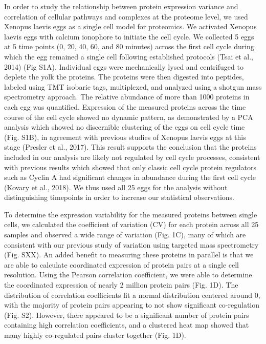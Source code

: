 In order to study the relationship between protein expression variance and correlation of cellular pathways and complexes at the proteome level, we used Xenopus laevis eggs as a single cell model for proteomics. We activated Xenopus laevis eggs with calcium ionophore to initiate the cell cycle. We collected 5 eggs at 5 time points (0, 20, 40, 60, and 80 minutes) across the first cell cycle during which the egg remained a single cell following established protocols (Tsai et al., 2014)  (Fig S1A). Individual eggs were mechanically lysed and centrifuged to deplete the yolk the proteins. The proteins were then digested into peptides, labeled using TMT isobaric tags, multiplexed, and analyzed using a shotgun mass spectrometry approach. The relative abundance of more than 1000 proteins in each egg was quantified. Expression of the measured proteins across the time course of the cell cycle showed no dynamic pattern, as demonstrated by a PCA analysis which showed no discernible clustering of the eggs on cell cycle time (Fig. S1B), in agreement with previous studies of Xenopus laevis eggs at this stage (Presler et al., 2017). This result supports the conclusion that the proteins included in our analysis are likely not regulated by cell cycle processes, consistent with previous results which showed that only classic cell cycle protein regulators such as Cyclin A had significant changes in abundance during the first cell cycle (Kovary et al., 2018).  We thus used all 25 eggs for the analysis without distinguishing timepoints in order to increase our statistical observations.

To determine the expression variability for the measured proteins between single cells, we calculated the coefficient of variation (CV) for each protein across all 25 samples and observed a wide range of variation (Fig. 1C), many of which are consistent with our previous study of variation using targeted mass spectrometry (Fig. SXX). An added benefit to measuring these proteins in parallel is that we are able to calculate coordinated expression of protein pairs at a single cell resolution. Using the Pearson correlation coefficient, we were able to determine the coordinated expression of nearly 2 million protein pairs (Fig. 1D). The distribution of correlation coefficients fit a normal distribution centered around 0, with the majority of protein pairs appearing to not show significant co-regulation (Fig. S2). However, there appeared to be a significant number of protein pairs containing high correlation coefficients, and a clustered heat map showed that many highly co-regulated pairs cluster together (Fig. 1D).

